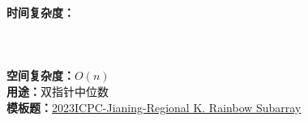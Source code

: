\textbf{时间复杂度：}\\
\\
\\
\\
\textbf{空间复杂度：}$O(n)$\\
\textbf{用途：}双指针中位数\\
\textbf{模板题：}\href{https://qoj.ac/contest/1472/problem/7904}{2023ICPC-Jianing-Regional K. Rainbow Subarray}
